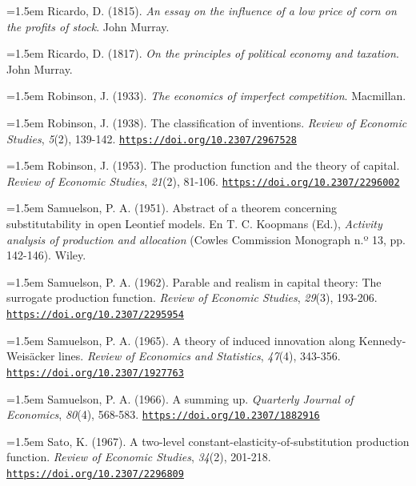 \documentclass[10pt,a4paper]{article}
\begin{document}
\noindent\hangindent=1.5em Ricardo, D. (1815). \textit{An essay on the influence of a low price of corn on the profits of stock}. John Murray.

\noindent\hangindent=1.5em Ricardo, D. (1817). \textit{On the principles of political economy and taxation}. John Murray.

\noindent\hangindent=1.5em Robinson, J. (1933). \textit{The economics of imperfect competition}. Macmillan.

\noindent\hangindent=1.5em Robinson, J. (1938). The classification of inventions. \textit{Review of Economic Studies}, \textit{5}(2), 139-142. \href{https://doi.org/10.2307/2967528}{\nolinkurl{https://doi.org/10.2307/2967528}}

\noindent\hangindent=1.5em Robinson, J. (1953). The production function and the theory of capital. \textit{Review of Economic Studies}, \textit{21}(2), 81-106. \href{https://doi.org/10.2307/2296002}{\nolinkurl{https://doi.org/10.2307/2296002}}

\noindent\hangindent=1.5em Samuelson, P. A. (1951). Abstract of a theorem concerning substitutability in open Leontief models. En T. C. Koopmans (Ed.), \textit{Activity analysis of production and allocation} (Cowles Commission Monograph n.º 13, pp. 142-146). Wiley.

\noindent\hangindent=1.5em Samuelson, P. A. (1962). Parable and realism in capital theory: The surrogate production function. \textit{Review of Economic Studies}, \textit{29}(3), 193-206. \href{https://doi.org/10.2307/2295954}{\nolinkurl{https://doi.org/10.2307/2295954}}

\noindent\hangindent=1.5em Samuelson, P. A. (1965). A theory of induced innovation along Kennedy-Weisäcker lines. \textit{Review of Economics and Statistics}, \textit{47}(4), 343-356. \href{https://doi.org/10.2307/1927763}{\nolinkurl{https://doi.org/10.2307/1927763}}

\noindent\hangindent=1.5em Samuelson, P. A. (1966). A summing up. \textit{Quarterly Journal of Economics}, \textit{80}(4), 568-583. \href{https://doi.org/10.2307/1882916}{\nolinkurl{https://doi.org/10.2307/1882916}}

\noindent\hangindent=1.5em Sato, K. (1967). A two-level constant-elasticity-of-substitution production function. \textit{Review of Economic Studies}, \textit{34}(2), 201-218. \href{https://doi.org/10.2307/2296809}{\nolinkurl{https://doi.org/10.2307/2296809}}
\end{document}
